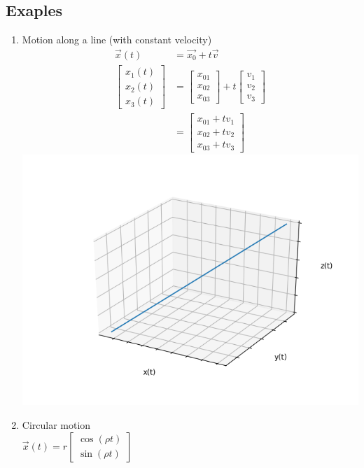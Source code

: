 \documentclass[a4paper,12pt]{article}
\begin{document}
\subsection*{Exaples}
\begin{enumerate}
	\item Motion along a line (with constant velocity)
	\begin{align*}
		\vec{x}(t)& = \vec{x_0} + t \vec{v} \\
		\begin{bmatrix} x_1(t) \\ x_2(t) \\ x_3(t) \end{bmatrix} & = 
		\begin{bmatrix} x_{01} \\ x_{02} \\ x_{03} \end{bmatrix} +
		t \begin{bmatrix} v_1 \\ v_2 \\ v_3 \end{bmatrix} \\	
		& = \begin{bmatrix} x_{01} + t v_1\\ x_{02} + t v_2 \\ x_{03} + t v_3 \end{bmatrix}
	\end{align*}
	\includegraphics[scale=0.4]{straigt_line}
	\item Circular motion \\
	$\vec{x}(t) = r \begin{bmatrix} \cos(\rho t) \\ \sin(\rho t) \end{bmatrix}$ \\

\end{enumerate}
\end{document}
